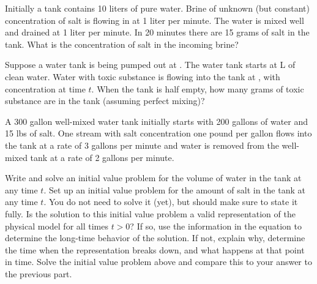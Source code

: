 \documentclass{ximera}
\begin{document}
\begin{exercise}
    Initially a tank contains 10 liters of pure water. Brine of unknown (but constant) concentration of salt is flowing in at 1 liter per minute. The water is mixed well and drained at 1 liter per minute. In 20 minutes there are 15 grams of salt in the tank.  What is the concentration of salt in the incoming brine?
\end{exercise}

\begin{exercise}%
    Suppose a water tank is being pumped out at .  The water tank starts at \unit[10]{L} of clean water. Water with toxic substance is flowing into the tank at , with concentration  at time $t$. When the tank is half empty, how many grams of toxic substance are in the tank (assuming perfect mixing)?
\end{exercise}

\begin{exercise}
    A 300 gallon well-mixed water tank initially starts with 200 gallons of water and 15 lbs of salt. One stream with salt concentration one pound per gallon flows into the tank at a rate of 3 gallons per minute and water is removed from the well-mixed tank at a rate of 2 gallons per minute.
    \begin{tasks}
        \task Write and solve an initial value problem for the volume of water in the tank at any time $t$.
        \task Set up an initial value problem for the amount of salt in the tank at any time $t$. You do not need to solve it (yet), but should make sure to state it fully.
        \task Is the solution to this initial value problem a valid representation of the physical model for all times $t > 0$? If so, use the information in the equation to determine the long-time behavior of the solution. If not, explain why, determine the time when the representation breaks down, and what happens at that point in time.
        \task Solve the initial value problem above and compare this to your answer to the previous part.
    \end{tasks}
\end{exercise}
\end{document}
